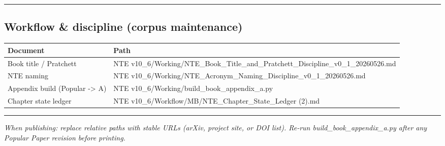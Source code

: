 \documentclass[
  11pt,
]{article}
\newcounter{none} %
\begin{document}
\begin{center}\rule{0.5\linewidth}{0.5pt}\end{center}

\subsection{Workflow \& discipline (corpus
maintenance)}\label{workflow-discipline-corpus-maintenance}

{\def\LTcaptype{none} %
\begin{longtable}[]{@{}
  >{\raggedright\arraybackslash}p{}
  >{\raggedright\arraybackslash}p{}@{}}
\toprule\noalign{}
\begin{minipage}[b]{\linewidth}\raggedright
Document
\end{minipage} & \begin{minipage}[b]{\linewidth}\raggedright
Path
\end{minipage} \\
\midrule\noalign{}
\endhead
\bottomrule\noalign{}
\endlastfoot
Book title /\allowbreak{} Pratchett & NTE
v10\_\allowbreak{}6/\allowbreak{}Working/\allowbreak{}NTE\_\allowbreak{}Book\_\allowbreak{}Title\_\allowbreak{}and\_\allowbreak{}Pratchett\_\allowbreak{}Discipline\_\allowbreak{}v0\_\allowbreak{}1\_\allowbreak{}20260526.md \\
NTE naming & NTE
v10\_\allowbreak{}6/\allowbreak{}Working/\allowbreak{}NTE\_\allowbreak{}Acronym\_\allowbreak{}Naming\_\allowbreak{}Discipline\_\allowbreak{}v0\_\allowbreak{}1\_\allowbreak{}20260526.md \\
Appendix build (Popular -\textgreater{} A) & NTE
v10\_\allowbreak{}6/\allowbreak{}Working/\allowbreak{}build\_\allowbreak{}book\_\allowbreak{}appendix\_\allowbreak{}a.py \\
Chapter state ledger & NTE
v10\_\allowbreak{}6/\allowbreak{}Workflow/\allowbreak{}MB/\allowbreak{}NTE\_\allowbreak{}Chapter\_\allowbreak{}State\_\allowbreak{}Ledger
(2).md \\
\end{longtable}
}

\begin{center}\rule{0.5\linewidth}{0.5pt}\end{center}

\emph{When publishing: replace relative paths with stable URLs (arXiv,
project site, or DOI list). Re-run build\_book\_appendix\_a.py after any
Popular Paper revision before printing.}
\end{document}
